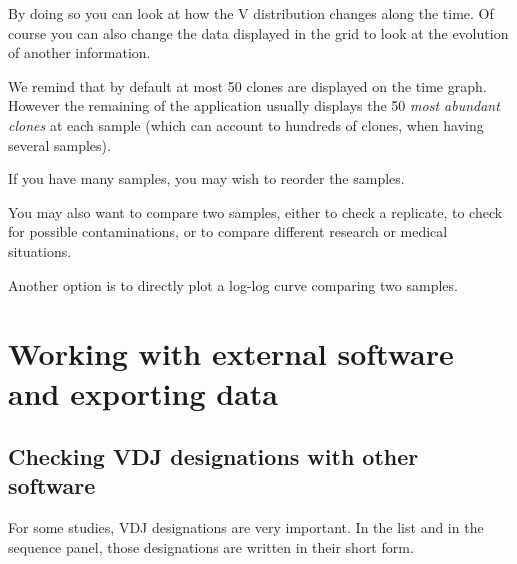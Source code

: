 \documentclass[10pt]{article}
\begin{document}
By doing so you can look at how the V distribution changes along the time.
Of course you can also change the data displayed in the grid to look at
the evolution of another information.

\bigskip

We remind that by default at most 50 clones are displayed
on the time graph. However the remaining of the application usually displays
the 50 \textit{most abundant clones} at each sample (which can account to hundreds of
clones, when having several samples).


\bigskip

If you have many samples, you may wish to reorder the samples.




\bigskip

You may also want to compare two samples, either to check a replicate, to check for possible contaminations, or to
compare different research or medical situations.


Another option is to directly plot a log-log curve comparing two samples.



\section{Working with external software and exporting data}

\subsection{Checking VDJ designations with other software}
For some studies, VDJ designations are very important.
In the list and in the sequence panel, those designations are written in their
short form.
\end{document}
